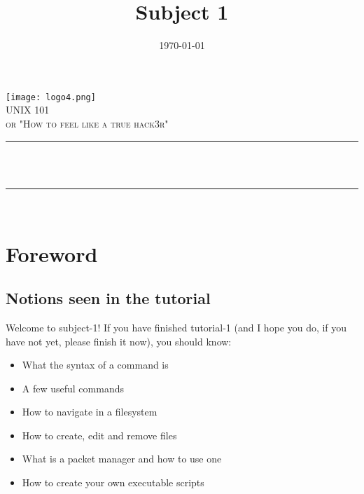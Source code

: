 \documentclass[12pt]{article}
\title{Subject 1}								%
\date{\today}											%
\makeatletter
\let\thetitle\@title
\let\thedate\@date
\makeatother
\begin{document}

\begin{titlepage}
	\centering
    \vspace*{0.5 cm}
    \texttt{[image: logo4.png]}\\[1.0 cm]
    \textsc{\LARGE \newline\newline UNIX 101}\\[2.0 cm]
	\textsc{\Large or "How to feel like a true hack3r"}\\[0.5 cm]
	\rule{\linewidth}{0.2 mm} \\[0.4 cm]
	{ \huge \bfseries \thetitle}\\
	\rule{\linewidth}{0.2 mm} \\[1.5 cm]
	
    \thedate
    
    
    
	
\end{titlepage}


\tableofcontents
\pagebreak


\section{Foreword}
\subsection{Notions seen in the tutorial}

Welcome to subject-1! If you have finished tutorial-1 (and I hope you do, if you have not yet, please finish it now), you should know:

\begin{itemize}
\item What the syntax of a command is
\item A few useful commands
\item How to navigate in a filesystem
\item How to create, edit and remove files
\item What is a packet manager and how to use one 
\item How to create your own executable scripts
\end{itemize}
\end{document}
